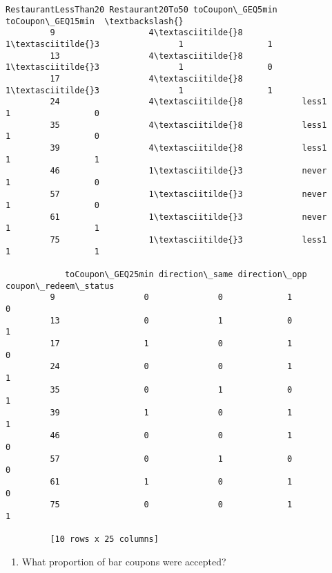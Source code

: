 \documentclass[11pt]{article}
\providecommand{\tightlist}{%
      \setlength{\itemsep}{0pt}\setlength{\parskip}{0pt}}
\begin{document}
\begin{Verbatim}[commandchars=\\\{\}]
            RestaurantLessThan20 Restaurant20To50 toCoupon\_GEQ5min toCoupon\_GEQ15min  \textbackslash{}
         9                   4\textasciitilde{}8              1\textasciitilde{}3                1                 1   
         13                  4\textasciitilde{}8              1\textasciitilde{}3                1                 0   
         17                  4\textasciitilde{}8              1\textasciitilde{}3                1                 1   
         24                  4\textasciitilde{}8            less1                1                 0   
         35                  4\textasciitilde{}8            less1                1                 0   
         39                  4\textasciitilde{}8            less1                1                 1   
         46                  1\textasciitilde{}3            never                1                 0   
         57                  1\textasciitilde{}3            never                1                 0   
         61                  1\textasciitilde{}3            never                1                 1   
         75                  1\textasciitilde{}3            less1                1                 1   
         
            toCoupon\_GEQ25min direction\_same direction\_opp  coupon\_redeem\_status  
         9                  0              0             1                     0  
         13                 0              1             0                     1  
         17                 1              0             1                     0  
         24                 0              0             1                     1  
         35                 0              1             0                     1  
         39                 1              0             1                     1  
         46                 0              0             1                     0  
         57                 0              1             0                     0  
         61                 1              0             1                     0  
         75                 0              0             1                     1  
         
         [10 rows x 25 columns]
\end{Verbatim}
            
    \begin{enumerate}
\def\labelenumi{\arabic{enumi}.}
\setcounter{enumi}{1}
\tightlist
\item
  What proportion of bar coupons were accepted?
\end{enumerate}
\end{document}
